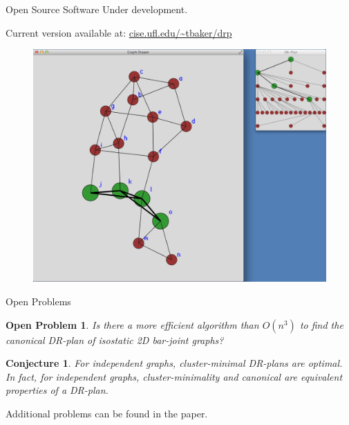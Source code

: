 \documentclass{beamer}
\newtheorem{openproblem}{\sffamily Open Problem}
\newtheorem{conjecture}{\sffamily Conjecture}
\begin{document}
\begin{frame}{Open Source Software}
    Under development.

    Current version available at: \url{cise.ufl.edu/~tbaker/drp}
    \begin{figure}\centering
        \includegraphics[width=0.65\linewidth]{../../img/screenshots/node_in_drp}
    \end{figure}
\end{frame}

\begin{frame}{Open Problems}
    \begin{openproblem}
        Is there a more efficient algorithm than $O(n^3)$ to find the canonical DR-plan of isostatic 2D bar-joint graphs?
    \end{openproblem}

    \begin{conjecture}
    \label{conj:mfaisoptimal:rephrase}
        For independent graphs, cluster-minimal DR-plans are optimal. In fact, for independent graphs, cluster-minimality and canonical are equivalent properties of a DR-plan.
    \end{conjecture}

    Additional problems can be found in the paper.
\end{frame}


\end{document}

